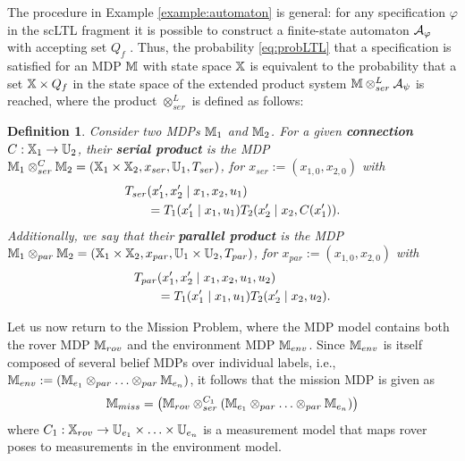 \documentclass[conference]{IEEEtran}
\renewcommand{\cite}[1]{\citep{#1}}
\newtheorem{definition}{Definition}
\begin{document}
The procedure in Example \ref{example:automaton} is general: for any specification $\varphi$ in the scLTL fragment it is possible to construct a finite-state automaton $\mathcal{A}_\varphi$ with accepting set $Q_f$ \cite{Belta2017}. Thus, the probability \eqref{eq:probLTL} that a specification is satisfied for an MDP $\mathbb{M}$ with state space $\mathbb{X}$ is equivalent to the probability that a set $\mathbb{X}\times Q_f$ in the state space of the extended product system $\mathbb{M} \otimes_{ser}^L \mathcal{A}_\psi$ is reached, where the product $\otimes_{ser}^L$ is defined as follows:
\begin{definition} Consider two MDPs  $\mathbb{M}_1$ and $\mathbb{M}_2$. For a given \textbf{connection} $C : \mathbb{X}_1 \rightarrow \mathbb{U}_2$, their \textbf{serial product} is the MDP $\mathbb{M}_1 \otimes_{ser}^C \mathbb{M}_2 = (\mathbb{X}_1 \times \mathbb{X}_2, x_{ser}, \mathbb{U}_1, T_{ser})$, for $x_{ser}:= (x_{1,0},x_{2,0})$
  with
  \begin{equation}\label{eq:serial}
  \begin{aligned}
      \tr_{ser}&(x_1', x_2' \mid x_1, x_2, u_1) \\
      & = \tr_1 (x_1' \mid x_1, u_1) \tr_2 (x_2' \mid x_2, C(x_1') ).
  \end{aligned}
  \end{equation}
  Additionally, we say that their  \textbf{parallel product} is the MDP $\mathbb{M}_1 \otimes_{par} \mathbb{M}_2 = (\mathbb{X}_1 \times \mathbb{X}_2, x_{par}, \mathbb{U}_1 \times \mathbb{U}_2, T_{par})$,  for $x_{par}:= (x_{1,0},x_{2,0})$ with
  \begin{equation}
  \begin{aligned}
      T_{par}&(x_1', x_2' \mid x_1, x_2, u_1, u_2) \\
      & = T_1 (x_1' \mid x_1, u_1) T_2 (x_2' \mid x_2, u_2).
  \end{aligned}
  \end{equation}
\end{definition}

Let us now return to the Mission Problem, where the MDP model contains both the rover MDP $\mathbb{M}_{rov}$ and the environment MDP $\mathbb{M}_{env}$. Since $\mathbb{M}_{env}$ is itself composed of several belief MDPs over individual labels, i.e., $\mathbb{M}_{env}:=\left( \mathbb{M}_{e_1} \otimes_{par} \ldots \otimes_{par} \mathbb{M}_{e_n} \right) $, it follows that the mission MDP is given as
\begin{equation}
  \mathbb{M}_{miss} = \left( \mathbb{M}_{rov} \otimes_{ser}^{C_1}\left( \mathbb{M}_{e_1} \otimes_{par} \ldots \otimes_{par} \mathbb{M}_{e_n} \right) \right)
\end{equation}
where $C_1 : \mathbb{X}_{rov} \rightarrow \mathbb{U}_{e_1} \times \ldots \times \mathbb{U}_{e_n}$ is a measurement model that maps rover poses to measurements in the environment model.
\end{document}
